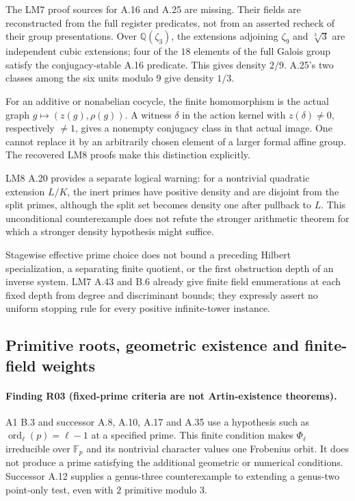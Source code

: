 \documentclass[11pt,a4paper]{article}
\begin{document}
The LM7 proof sources for A.16 and A.25 are missing. Their fields are
reconstructed from the full register predicates, not from an asserted
recheck of their group presentations. Over $\mathbb Q(\zeta_3)$, the
extensions adjoining $\zeta_9$ and $\sqrt[3]3$ are independent cubic
extensions; four of the $18$ elements of the full Galois group satisfy
the conjugacy-stable A.16 predicate. This gives density $2/9$.
A.25's two classes among the six units modulo $9$ give density $1/3$.

For an additive or nonabelian cocycle, the finite homomorphism is the
actual graph $g\mapsto(z(g),\rho(g))$. A witness $\delta$ in the
action kernel with $z(\delta)\ne0$, respectively $\ne1$, gives a
nonempty conjugacy class in that actual image. One cannot replace it
by an arbitrarily chosen element of a larger formal affine group.
The recovered LM8 proofs make this distinction explicitly.

LM8 A.20 provides a separate logical warning: for a nontrivial quadratic
extension $L/K$, the inert primes have positive density and are
disjoint from the split primes, although the split set becomes
density one after pullback to $L$. This unconditional counterexample
does not refute the stronger arithmetic theorem for which a stronger
density hypothesis might suffice.

Stagewise effective prime choice does not bound a preceding Hilbert
specialization, a separating finite quotient, or the first obstruction
depth of an inverse system. LM7 A.43 and B.6 already give finite
field enumerations at each fixed depth from degree and discriminant
bounds; they expressly assert no uniform stopping rule for every
positive infinite-tower instance.

\subsection{Primitive roots, geometric existence and finite-field weights}

\paragraph{Finding R03 (fixed-prime criteria are not Artin-existence theorems).}
A1 B.3 and successor A.8, A.10, A.17 and A.35 use a hypothesis such as
$\operatorname{ord}_\ell(p)=\ell-1$ at a specified prime. This finite
condition makes $\Phi_\ell$ irreducible over $\mathbb F_p$ and its
nontrivial character values one Frobenius orbit. It does not produce
a prime satisfying the additional geometric or numerical conditions.
Successor A.12 supplies a genus-three counterexample to extending a
genus-two point-only test, even with $2$ primitive modulo $3$.
\end{document}
